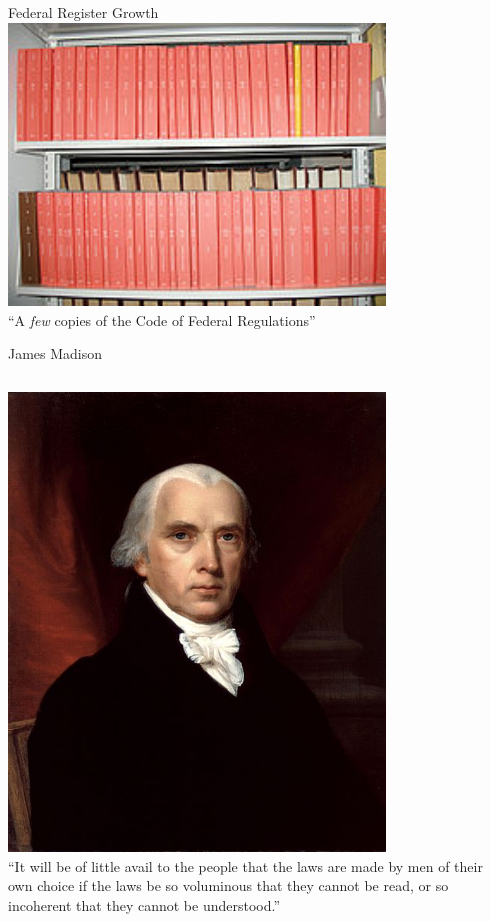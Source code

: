 \begin{frame}{Federal Register Growth}
    \centering
    \includegraphics[width=0.75\textwidth]{img/fed-reg-bookshelf.png} \\
    { \large ``A \emph{few} copies of the Code of Federal Regulations'' \\ }
\end{frame}

\begin{frame}{James Madison}
    \begin{columns}[onlytextwidth]
            \centering
            \includegraphics[width=0.75\textwidth]{img/madison.jpg} \\
            ``It will be of little avail to the people that the laws are made
            by men of their own choice if the laws be so voluminous that they
            cannot be read, or so incoherent that they cannot be understood.''
    \end{columns}
\end{frame}


